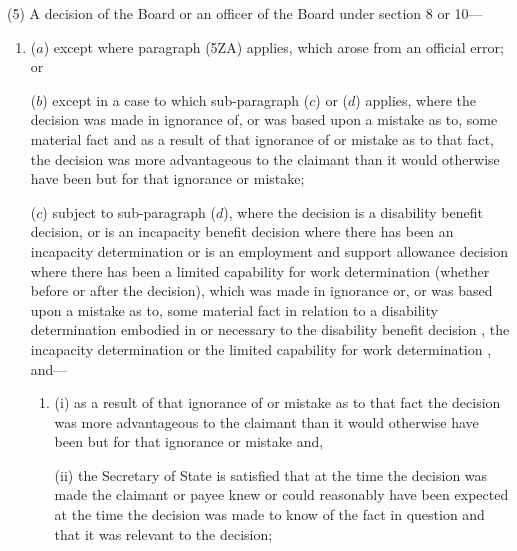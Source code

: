 \documentclass[12pt,a4paper]{article}
\begin{document}
(5) A decision of the 
Board or an officer of the Board  %
under section 8 or 10—
\begin{enumerate}\item[]
($a$) 
except where paragraph (5ZA) applies,  %
which arose from an official error; or

($b$) 
except in a case to which sub-paragraph ($c$)  or ($d$)  applies,  %
where the decision was made in ignorance of, or was based upon a mistake as to, some material fact and as a result of that ignorance of or mistake as to that fact, the decision was more advantageous to the claimant than it would otherwise have been but for that ignorance or mistake;


($c$) 
subject to sub-paragraph ($d$),  %
where the decision is a disability benefit decision, or is an incapacity benefit decision where there has been an incapacity determination 
or is an employment and support allowance decision where there has been a limited capability for work determination  %
(whether before or after the decision), which was made in ignorance or, or was based upon a mistake as to, some material fact in relation to a disability determination embodied in or necessary to the disability benefit decision%
, the incapacity determination or the limited capability for work determination%
, and---
\begin{enumerate}\item[]
(i) as a result of that ignorance of or mistake as to that fact the decision was more advantageous to the claimant than it would otherwise have been but for that ignorance or mistake and,

(ii) the Secretary of State is satisfied that at the time the decision was made the claimant or payee knew or could reasonably have been expected at the time the decision was made to know of the fact in question and that it was relevant to the decision;
\end{enumerate}


\end{enumerate}
\end{document}
